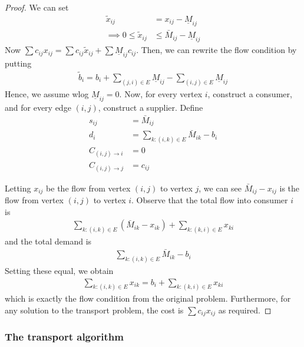 \documentclass{../template/note}
\begin{document}
    \begin{proof}
        We can set
        \begin{align*}
            \tilde x_{ij} &= x_{ij} - \underline M_{ij} \\
            \implies 0 \leq \tilde x_{ij} &\leq \bar M_{ij} - \underline M_{ij}
        \end{align*}
        Now $\sum c_{ij} x_{ij} = \sum c_{ij} \tilde x_{ij} + \sum \underline M_{ij} c_{ij}$. Then, we can rewrite the flow condition by putting
        \begin{align*}
            \tilde b_i = b_i + \sum_{(j, i) \in E} \underline M_{ij} - \sum_{(i, j) \in E} \underline M_{ij}
        \end{align*}
        Hence, we assume wlog $\underline M_{ij} = 0$. Now, for every vertex $i$, construct a consumer, and for every edge $(i, j)$, construct a supplier. Define
        \begin{align*}
            s_{ij} &= \bar M_{ij} \\
            d_i &= \sum_{k: (i, k) \in E} \bar M_{ik} - b_i \\
            C_{(i, j) \to i} &= 0 \\
            C_{(i, j) \to j} &= c_{ij}
        \end{align*}

        Letting $x_{ij}$ be the flow from vertex $(i, j)$ to vertex $j$, we can see $\bar M_{ij} - x_{ij}$ is the flow from vertex $(i, j)$ to vertex $i$. Observe that the total flow into consumer $i$ is
        \begin{align*}
            \sum_{k: (i, k) \in E} (\bar M_{ik} - x_{ik}) + \sum_{k: (k, i) \in E} x_{ki}
        \end{align*}
        and the total demand is
        \begin{align*}
            \sum_{k: (i, k) \in E} \bar M_{ik} - b_i
        \end{align*}
        Setting these equal, we obtain
        \begin{align*}
            \sum_{k: (i, k) \in E} x_{ik} = b_i + \sum_{k: (k, i) \in E} x_{ki}
        \end{align*}
        which is exactly the flow condition from the original problem. Furthermore, for any solution to the transport problem, the cost is $\sum c_{ij} x_{ij}$ as required.  
    \end{proof}
    
    \subsubsection{The transport algorithm}
\end{document}
